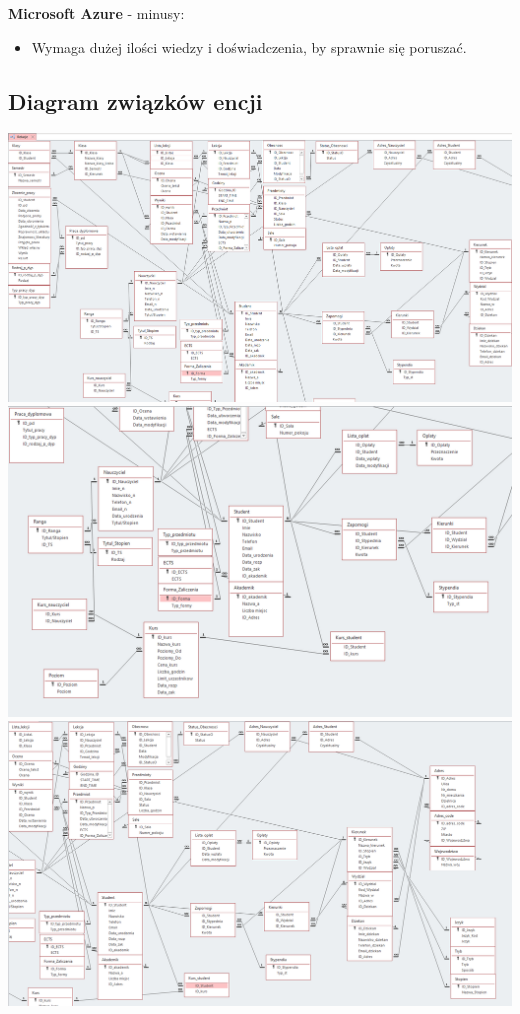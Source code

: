 \documentclass[12pt,a4paper]{article}
\begin{document}
\textbf{Microsoft Azure} - minusy:
\begin{itemize}
	\item Wymaga dużej ilości wiedzy i doświadczenia, by sprawnie się poruszać.
\end{itemize}

\subsection{Diagram związków encji}
\label{sec:ERD} 

\newline
\noindent
\includegraphics[scale=0.37]{Damian_Schroder_271395_ERD__cz1.png}\\
\newline
\includegraphics[scale=0.48]{Damian_Schroder_271395_ERD__cz2.png}\\
\includegraphics[scale=0.39]{Damian_Schroder_271395_ERD__cz3.png}\\
\end{document}
